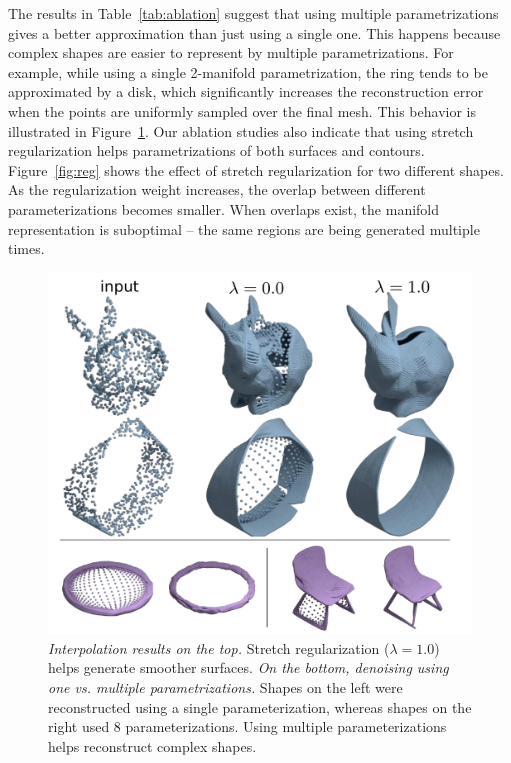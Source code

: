 The results in Table~\ref{tab:ablation} suggest that using multiple parametrizations gives a better approximation than just using a single one.
This happens because complex shapes are easier to represent by multiple parametrizations.
For example, while using a single 2-manifold parametrization, the ring tends to be approximated by a disk, which significantly increases the reconstruction error when
the points are uniformly sampled over the final mesh.
This behavior is illustrated in Figure~\ref{dmp:interp}.
Our ablation studies also indicate that using stretch regularization helps
parametrizations of both surfaces and contours.
Figure~\ref{fig:reg} shows the effect of stretch regularization for
two different shapes.
As the regularization weight increases, the overlap between different parameterizations becomes smaller.
When overlaps exist, the manifold representation is suboptimal --
the same regions are being generated multiple times.

\begin{figure}
\centering
\includegraphics[width=0.6\linewidth]{dmp/imgs/interp_rings.pdf}
    \caption{\label{dmp:interp} \small 
    \emph{Interpolation results on the top.}
    Stretch regularization ($\lambda=1.0$) helps
    generate smoother surfaces.
    \emph{On the bottom, denoising using one vs. multiple parametrizations.}
   Shapes on the left were reconstructed using a single parameterization, 
    whereas shapes on the right used 8 parameterizations. 
    Using multiple parameterizations helps reconstruct complex shapes.
}
\vspace{-10pt}
\end{figure}


